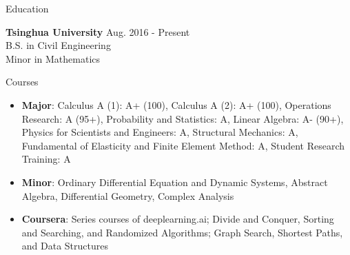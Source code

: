 \documentclass{resume} %
\begin{document}

\begin{rSection}{Education}

{\bf Tsinghua University} \hfill {Aug. 2016 - Present} \\ 
B.S. in Civil Engineering \\
Minor in Mathematics
\end{rSection}

\begin{rSection}{Courses}
\begin{itemize}
    \item \textbf{Major}: 
    Calculus A (1): A+ (100), Calculus A (2): A+ (100), Operations Research: A (95+), Probability and Statistics: A, Linear Algebra: A- (90+), Physics for Scientists and Engineers: A, Structural Mechanics: A, Fundamental of Elasticity and Finite Element Method: A, Student Research Training: A
    \item \textbf{Minor}:
    Ordinary Differential Equation and Dynamic Systems, Abstract Algebra, Differential Geometry, Complex Analysis
    \item \textbf{Coursera}:
    Series courses of deeplearning.ai; Divide and Conquer, Sorting and Searching, and Randomized Algorithms; Graph Search, Shortest Paths, and Data Structures
\end{itemize}
\end{rSection}
\end{document}

